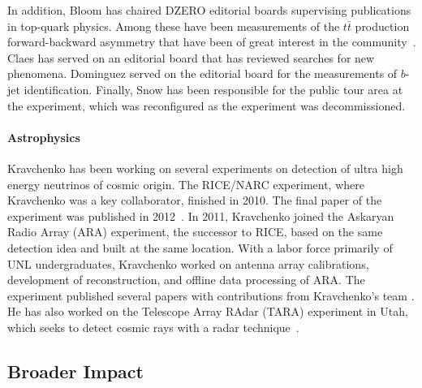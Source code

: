 In addition, Bloom has chaired DZERO editorial boards supervising publications in top-quark physics. Among these have been measurements of the $t\bar{t}$ production forward-backward asymmetry that have been of great interest in the community~\cite{bib:D0afb}. Claes has served on an editorial board that has reviewed searches for new phenomena. Dominguez served on the editorial board for the measurements of $b$-jet identification. Finally, Snow has been responsible for the public tour area at the experiment, which was reconfigured as the experiment was decommissioned.

\paragraph{Astrophysics}


Kravchenko has been working on several experiments on detection of ultra high energy
neutrinos of cosmic origin.  The RICE/NARC experiment, where Kravchenko was a key collaborator, finished in 2010. The final paper of the experiment was published in 2012~\cite{bib:RICE}. In 2011, Kravchenko joined the Askaryan Radio Array (ARA) experiment, the successor to RICE, based on the same detection idea and built at the same location. With a labor force  primarily of UNL undergraduates, Kravchenko worked on antenna array calibrations, development of reconstruction, and offline data processing of ARA. The experiment published several papers with contributions from Kravchenko's team \cite{bib:ARA}. He has also worked on the Telescope Array RAdar (TARA) experiment in Utah, which seeks to detect cosmic rays with a radar
technique~\cite{bib:CRADAR}.

\subsection{Broader Impact}

